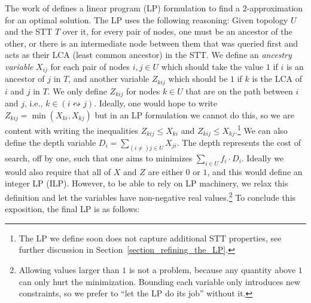 The work of \cite{GolinskyThesis} defines a linear program (LP) formulation to find a $2$-approximation for an optimal solution. The LP uses the following reasoning: Given topology $U$ and the STT $T$ over it, for every pair of nodes, one must be an ancestor of the other, or there is an intermediate node between them that was queried first and acts as their LCA (least common ancestor) in the STT. We define an \emph{ancestry variable} $X_{ij}$ for each pair of nodes  $i,j \in U$ which should take the value $1$ if $i$ is an ancestor of $j$ in $T$, and another variable $Z_{kij}$ which should be $1$ if $k$ is the LCA of $i$ and $j$ in $T$. We only define $Z_{kij}$ for nodes $k \in U$ that are on the path between $i$ and $j$, i.e., $k \in (i \leftrightsquigarrow j)$. Ideally, one would hope to write $Z_{kij} = \min(X_{ki},X_{kj})$ but in an LP formulation we cannot do this, so we are content with writing the inequalities $Z_{kij} \le X_{ki}$ and $Z_{kij} \le X_{kj}$.\footnote{The LP we define soon does not capture additional STT properties, see further discussion in Section~\ref{section_refining_the_LP}.} We can also define the depth variable $D_i = \sum_{(i \ne) j \in U}{X_{ji}}$. The depth represents the cost of search, off by one, such that one aims to minimizes $\sum_{i \in U}{f_i \cdot D_i}$. Ideally we would also require that all of $X$ and $Z$ are either $0$ or $1$, and this would define an integer LP (ILP). However, to be able to rely on LP machinery, we relax this definition and let the variables have non-negative real values.\footnote{Allowing values larger than $1$ is not a problem, because any quantity above $1$ can only hurt the minimization. Bounding each variable only introduces new constraints, so we prefer to ``let the LP do its job'' without it.}
To conclude this exposition, the final LP is as follows:

